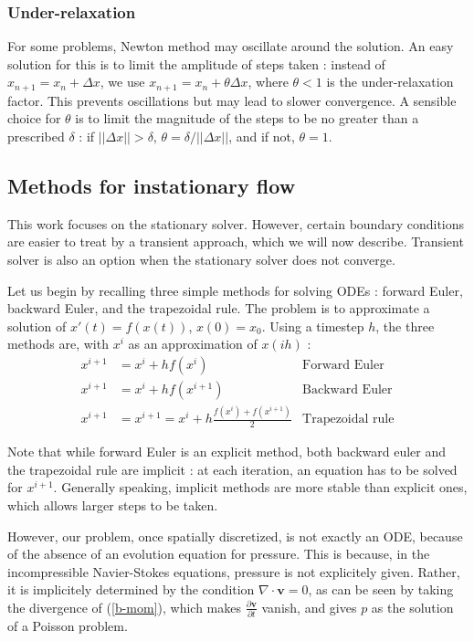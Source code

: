 \documentclass[12pt]{article}
\newcommand{\vb}[1]{\ensuremath{\boldsymbol #1}}
\begin{document}
\subsubsection{Under-relaxation}
For some problems, Newton method may oscillate around the solution. An
easy solution for this is to limit the amplitude of steps taken :
instead of $x_{n+1} = x_n + \Delta x$, we use $x_{n+1} = x_n +\theta
\Delta x$, where $\theta < 1$ is the under-relaxation factor. This
prevents oscillations but may lead to slower convergence. A sensible
choice for $\theta$ is to limit the magnitude of the steps to be no
greater than a prescribed $\delta$ : if $||\Delta x|| > \delta$,
$\theta = \delta / ||\Delta x||$, and if not, $\theta = 1$.

\subsection{Methods for instationary flow}
This work focuses on the stationary solver. However, certain boundary
conditions are easier to treat by a transient approach, which we will
now describe. Transient solver is also an option when the stationary
solver does not converge.

Let us begin by recalling three simple methods for solving ODEs :
forward Euler, backward Euler, and the trapezoidal rule. The problem
is to approximate a solution of $x'(t) = f(x(t))$, $x(0) =
x_0$. Using a timestep $h$, the three methods
are, with $x^i$ as an approximation of $x(i h)$ :
\begin{align}
  \label{fe}
  x^{i+1} &= x^i + h f(x^i) & \text{Forward Euler}\\
  \label{be}
  x^{i+1} &= x^i + h f(x^{i+1}) & \text{Backward Euler}\\
  \label{tr}
  x^{i+1} &= x^{i+1} = x^i + h \frac{f(x^i) + f(x^{i+1})}{2}&
  \text{Trapezoidal rule}
\end{align}

Note that while forward Euler is an explicit method, both backward
euler and the trapezoidal rule are implicit : at each iteration, an
equation has to be solved for $x^{i+1}$. Generally speaking, implicit
methods are more stable than explicit ones, which allows larger
steps to be taken.

However, our problem, once spatially discretized, is not exactly an
ODE, because of the absence of an evolution equation for
pressure. This is because, in the incompressible Navier-Stokes
equations, pressure is not explicitely given. Rather, it is
implicitely determined by the condition $\nabla \cdot \vb{v} = 0$, as
can be seen by taking the divergence of (\ref{b-mom}), which makes
$\frac{\partial \vb{v}}{\partial t}$ vanish, and gives $p$ as the
solution of a Poisson problem.
\end{document}
